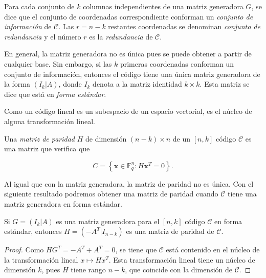 \begin{definition}
    Para cada conjunto de $k$ columnas independientes de una matriz generadora $G$, se dice que el conjunto de coordenadas correspondiente conforman un \emph{conjunto de información} de $\mathcal{C}$. Las $r = n-k$ restantes coordenadas se denominan \emph{conjunto de redundancia} y el número $r$ es la \emph{redundancia} de $\mathcal{C}$.
\end{definition}

En general, la matriz generadora no es única pues se puede obtener a partir de cualquier base. Sin embargo, si las $k$ primeras coordenadas conforman un conjunto de información, entonces el código tiene una única matriz generadora de la forma $( I_k | A)$, donde $I_k$ denota a la matriz identidad $k \times k$. Esta matriz se dice que está en \emph{forma estándar}.

Como un código lineal es un subespacio de un espacio vectorial, es el núcleo de alguna transformación lineal.

\begin{definition}
    Una \emph{matriz de paridad} $H$ de dimensión $(n-k) \times n$ de un $\left[ n,k \right]$ código $\mathcal{C}$ es una matriz que verifica que

    $$C = \left\lbrace \mathbf{x} \in \mathbb{F} _q^n : H\mathbf{x}^T = 0 \right\rbrace .$$
\end{definition}

Al igual que con la matriz generadora, la matriz de paridad no es única. Con el siguiente resultado podremos obtener una matriz de paridad cuando $\mathcal{C}$ tiene una matriz generadora en forma estándar.

\begin{theorem}
    \label{th:generadora-paridad}
    Si $G = \left( I_k | A \right)$ es una matriz generadora para el $\left[ n,k \right]$ código $\mathcal{C}$ en forma estándar, entonces $H = \left( -A^T | I_{n-k} \right)$ es una matriz de paridad de $\mathcal{C}$.
\end{theorem}

\begin{proof}
    Como $HG^T = -A^T + A^T = 0$, se tiene que $\mathcal{C}$ está contenido en el núcleo de la transformación lineal $x \mapsto Hx^T$. Esta transformación lineal tiene un núcleo de dimensión $k$, pues $H$ tiene rango $n-k$, que coincide con la dimensión de $\mathcal{C}$.
\end{proof}

